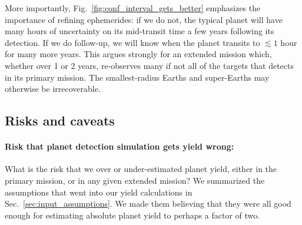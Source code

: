 More importantly, Fig.~\ref{fig:conf_interval_gets_better} emphasizes the importance of refining \tesss ephemerides: if we do not, the typical \tess planet will have many hours of uncertainty on its mid-transit time a few years following its detection.
If we do follow-up, we will know when the planet transits to $\lesssim1$ hour for many more years.
This argues strongly for an extended mission which, whether over 1 or 2 years, re-observes many if not all of the targets that \tess detects in its primary mission. 
The smallest-radius Earths and super-Earths may otherwise be irrecoverable.


\subsection{Risks and caveats}
\label{sec:risks_caveats}
\paragraph{Risk that planet detection simulation gets yield wrong:}
What is the risk that we over or under-estimated \tesss planet yield, either in the primary mission, or in any given extended mission?
We summarized the assumptions that went into our yield calculations in Sec.~\ref{sec:input_assumptions}.
We made them believing that they were all good enough for estimating \tesss absolute planet yield to perhaps a factor of two.

